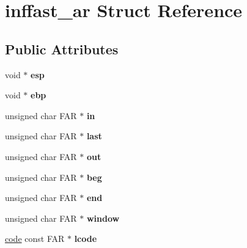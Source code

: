 \hypertarget{structinffast__ar}{}\section{inffast\+\_\+ar Struct Reference}
\label{structinffast__ar}
\subsection*{Public Attributes}
\begin{DoxyCompactItemize}
\item 
\mbox{\label{structinffast__ar_a216b92ac6455f35040ad2549856294aa}} 
void $\ast$ {\bfseries esp}
\item 
\mbox{\label{structinffast__ar_a9ba69ebd1079ce8dc9a22f84512ded12}} 
void $\ast$ {\bfseries ebp}
\item 
\mbox{\label{structinffast__ar_a7408e39701fb743d995b62c7e6329a45}} 
unsigned char F\+AR $\ast$ {\bfseries in}
\item 
\mbox{\label{structinffast__ar_ad9c879b06ccc2168e89ecbade4253c2f}} 
unsigned char F\+AR $\ast$ {\bfseries last}
\item 
\mbox{\label{structinffast__ar_a9885436fdacad6371baacacdeb7d05e7}} 
unsigned char F\+AR $\ast$ {\bfseries out}
\item 
\mbox{\label{structinffast__ar_adf81cf19e4d8a57308586b53a9dc2990}} 
unsigned char F\+AR $\ast$ {\bfseries beg}
\item 
\mbox{\label{structinffast__ar_a455cdbb223bb1abf21244f3b1d7b4f69}} 
unsigned char F\+AR $\ast$ {\bfseries end}
\item 
\mbox{\label{structinffast__ar_a9f95fa7e254bab2b3c0064718f563ec4}} 
unsigned char F\+AR $\ast$ {\bfseries window}
\item 
\mbox{\label{structinffast__ar_a7d0c6df5d66813134df3401d8a147081}} 
\hyperlink{structcode}{code} const F\+AR $\ast$ {\bfseries lcode}
\item 

\end{DoxyCompactItemize}
